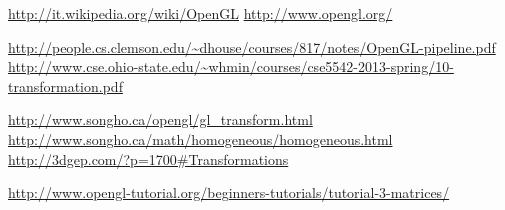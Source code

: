 \begin{thebibliography}{10}

 \url{http://it.wikipedia.org/wiki/OpenGL}
 \url{http://www.opengl.org/}



 \url{http://people.cs.clemson.edu/~dhouse/courses/817/notes/OpenGL-pipeline.pdf}
 \url{http://www.cse.ohio-state.edu/~whmin/courses/cse5542-2013-spring/10-transformation.pdf}

 \url{http://www.songho.ca/opengl/gl_transform.html}
 \url{http://www.songho.ca/math/homogeneous/homogeneous.html}
 \url{http://3dgep.com/?p=1700#Transformations}

 \url{http://www.opengl-tutorial.org/beginners-tutorials/tutorial-3-matrices/}
%
%
%






\end{thebibliography}
